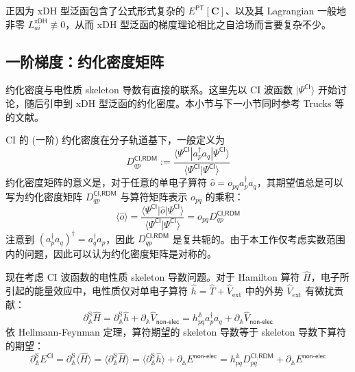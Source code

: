正因为 xDH 型泛函包含了公式形式复杂的 $E^\textsf{PT} [\mathbf{C}]$、以及其 Lagrangian 一般地非零 $L_{ai}^\textsf{xDH} \not \equiv 0$，从而 xDH 型泛函的梯度理论相比之自洽场而言要复杂不少。

\subsection{一阶梯度：约化密度矩阵}

约化密度与电性质 skeleton 导数有直接的联系。这里先以 CI 波函数 $| \Psi^\textsf{CI} \rangle$ 开始讨论，随后引申到 xDH 型泛函的约化密度。本小节与下一小节同时参考 Trucks 等的文献\cite{Trucks-Bartlett.CPL.1988}。

CI 的 (一阶) 约化密度在分子轨道基下，一般定义为
\begin{equation}
  \label{eq.3.def.rdm-ci}
  D_{qp}^{\textsf{CI},\textsf{RDM}} := \frac{\langle \Psi^\textsf{CI} | a_p^\dagger a_q | \Psi^\textsf{CI} \rangle}{\langle \Psi^\textsf{CI} | \Psi^\textsf{CI} \rangle}
\end{equation}
约化密度矩阵的意义是，对于任意的单电子算符 $\hat o = o_{pq} a_p^\dagger a_q$，其期望值总是可以写为约化密度矩阵 $D_{qp}^{\textsf{CI},\textsf{RDM}}$ 与算符矩阵表示 $o_{pq}$ 的乘积：
\begin{equation*}
  \langle \hat o \rangle = \frac{\langle \Psi^\textsf{CI} | \hat o | \Psi^\textsf{CI} \rangle}{\langle \Psi^\textsf{CI} | \Psi^\textsf{CI} \rangle} = o_{pq} D_{qp}^{\textsf{CI},\textsf{RDM}}
\end{equation*}
注意到 $(a_p^\dagger a_q)^\dagger = a_q^\dagger a_p$，因此 $D_{qp}^{\textsf{CI},\textsf{RDM}}$ 是复共轭的。由于本工作仅考虑实数范围内的问题，因此可以认为约化密度矩阵是对称的。

现在考虑 CI 波函数的电性质 skeleton 导数问题。对于 Hamilton 算符 $\hat H$，电子所引起的能量效应中，电性质仅对单电子算符 $\hat h = \hat T + \hat V_\mathrm{ext}$ 中的外势 $\hat V_\mathrm{ext}$ 有微扰贡献：
\begin{equation}
  \partial_{\mathbb{A}}^\mathrm{S} \hat H = \partial_{\mathbb{A}}^\mathrm{S} \hat h + \partial_{\mathbb{A}} \hat V_\textsf{non-elec} = h_{pq}^{\mathbb{A}} a_p^\dagger a_q + \partial_{\mathbb{A}} \hat V_\textsf{non-elec}
\end{equation}
依 Hellmann-Feynman 定理，算符期望的 skeleton 导数等于 skeleton 导数下算符的期望：
\begin{equation}
  \partial_{\mathbb{A}}^\mathrm{S} E^\textsf{CI} = \partial_{\mathbb{A}}^\mathrm{S} \langle \hat H \rangle = \langle \partial_{\mathbb{A}}^\mathrm{S} \hat H \rangle = \langle \partial_{\mathbb{A}}^\mathrm{S} \hat h \rangle + \partial_{\mathbb{A}} E^\textsf{non-elec} = h_{pq}^{\mathbb{A}} D_{pq}^{\textsf{CI}, \textsf{RDM}} + \partial_{\mathbb{A}} E^\textsf{non-elec}
\end{equation}

